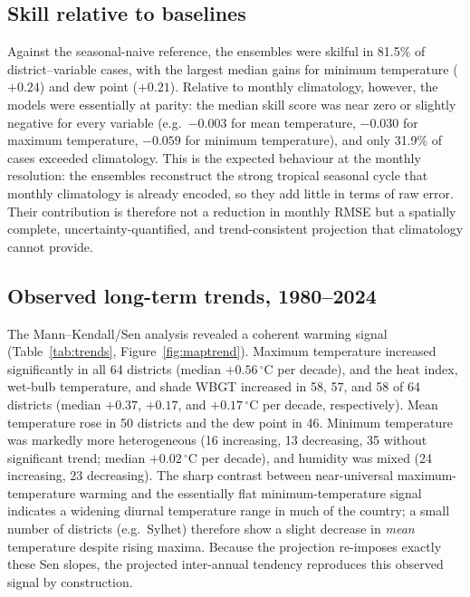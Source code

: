 \documentclass[pdflatex,sn-basic,lineno]{sn-jnl}
\newcommand{\degC}{\ensuremath{^{\circ}\mathrm{C}}}
\begin{document}
\begin{table}[htbp]
\centering
\caption{External validation of the projected 2025 fields against observed 2025,
summarised as the median across 64 districts. Errors are in each variable's
native unit ($\degC$ for temperatures and thermal indices; \% for humidity;
W\,m$^{-2}$ for solar radiation; index units for UV; $\degC$\,d\,d$^{-1}$ for
CDD).}
\label{tab:validation}

\end{table}

\subsection{Skill relative to baselines}\label{sec:res-skill}
Against the seasonal-naive reference, the ensembles were skilful in 81.5\% of
district--variable cases, with the largest median gains for minimum temperature
($+0.24$) and dew point ($+0.21$). Relative to monthly climatology, however, the
models were essentially at parity: the median skill score was near zero or
slightly negative for every variable (e.g.\ $-0.003$ for mean temperature,
$-0.030$ for maximum temperature, $-0.059$ for minimum temperature), and only
31.9\% of cases exceeded climatology. This is the expected behaviour at the monthly
resolution: the ensembles reconstruct the strong tropical seasonal cycle that
monthly climatology is already encoded, so they add little in terms of raw error. Their
contribution is therefore not a reduction in monthly RMSE but a spatially
complete, uncertainty-quantified, and trend-consistent projection that
climatology cannot provide.

\subsection{Observed long-term trends, 1980--2024}\label{sec:res-trend}
The Mann--Kendall/Sen analysis revealed a coherent warming signal
(Table~\ref{tab:trends}, Figure~\ref{fig:maptrend}). Maximum temperature
increased significantly in all 64 districts (median $+0.56\,\degC$ per decade),
and the heat index, wet-bulb temperature, and shade WBGT increased in 58, 57, and
58 of 64 districts (median $+0.37$, $+0.17$, and $+0.17\,\degC$ per decade,
respectively). Mean temperature rose in 50 districts and the dew point in 46. Minimum
temperature was markedly more heterogeneous (16 increasing, 13 decreasing, 35
without significant trend; median $+0.02\,\degC$ per decade), and humidity was
mixed (24 increasing, 23 decreasing). The sharp contrast between near-universal
maximum-temperature warming and the essentially flat minimum-temperature signal
indicates a widening diurnal temperature range in much of the country; a small
number of districts (e.g.\ Sylhet) therefore show a slight decrease in \emph{mean}
temperature despite rising maxima. Because the projection re-imposes exactly these
Sen slopes, the projected inter-annual tendency reproduces this observed signal by
construction.
\end{document}
